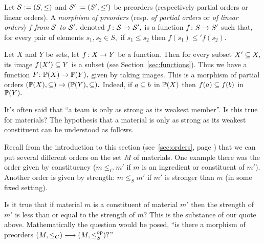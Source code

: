 \documentclass[CT4S-EN-RU]{subfiles}
\begin{document}
\begin{blockRUS}
\end{blockRUS}

\begin{definitionENG}\label{def:morphism of orders}
Let $\mcS:=(S,\leq)$ and $\mcS':=(S',\leq')$ be preorders (respectively partial orders or linear orders). A {\em morphism of preorders} (resp. {\em of partial orders} or {\em of linear orders}) $f$ {\em from $\mcS$ to $\mcS'$}, denoted $f\taking\mcS\to\mcS',$ is a function $f\taking S\to S'$ such that, for every pair of elements $s_1,s_2\in S,$ if $s_1\leq s_2$ then $f(s_1)\leq' f(s_2).$
\end{definitionENG}

\begin{definitionRUS}\label{def:morphism of orders}
\end{definitionRUS}

\begin{exampleENG}
Let $X$ and $Y$ be sets, let $f\taking X\to Y$ be a function. Then for every subset $X'\ss X,$ its image $f(X')\ss Y$ is a subset (see Section~\ref{sec:functions}). Thus we have a function $F\taking\PP(X)\to\PP(Y),$ given by taking images. This is a morphism of partial orders $(\PP(X),\ss)\to(\PP(Y),\ss).$ Indeed, if $a\ss b$ in $\PP(X)$ then $f(a)\ss f(b)$ in $\PP(Y).$
\end{exampleENG}

\begin{exampleRUS}
\end{exampleRUS}

\begin{applicationENG}
It's often said that “a team is only as strong as its weakest member”. Is this true for materials? The hypothesis that a material is only as strong as its weakest constituent can be understood as follows. 

Recall from the introduction to this section (see~\ref{sec:orders}, page \pageref{sec:orders}) that we can put several different orders on the set $M$ of materials. One example there was the order given by constituency ($m\leq_C m'$ if $m$ is an ingredient or constituent of $m'$). Another order is given by strength: $m\leq_S m'$ if $m'$ is stronger than $m$ (in some fixed setting). 

Is it true that if material $m$ is a constituent of material $m'$ then the strength of $m'$ is less than or equal to the strength of $m?$ This is the substance of our quote above. Mathematically the question would be posed, “is there a morphism of preorders $(M,\leq_C)\too(M,\leq_S\op)?$”
\end{applicationENG}
\end{document}
